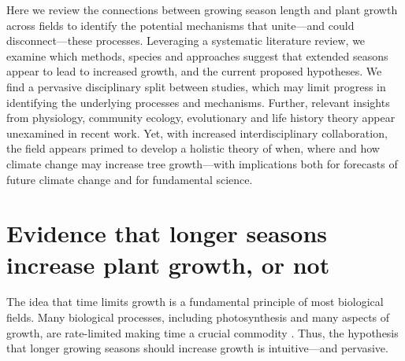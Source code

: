 \documentclass[11pt]{article}
\begin{document}
Here we review the connections between growing season length and plant growth across fields to identify the potential mechanisms that unite---and could disconnect---these processes. %
Leveraging a systematic literature review, we examine which methods, species and approaches suggest that extended seasons appear to lead to increased growth, and the current proposed hypotheses. We find a pervasive disciplinary split between studies, which may limit progress in identifying the underlying processes and mechanisms. Further, relevant insights from physiology, community ecology, evolutionary and life history theory appear unexamined in recent work. Yet, with increased interdisciplinary collaboration, the field appears primed to develop a holistic theory of when, where and how climate change may increase tree growth---with implications both for forecasts of future climate change and for fundamental science.

\section*{Evidence that longer seasons increase plant growth, or not}
The idea that time limits growth is a fundamental principle of most biological fields. Many biological processes, including photosynthesis and many aspects of growth, are rate-limited making time a crucial commodity \citep{nobel1983biophysical,cosgrove2005growth,hilty2021plant}. Thus, the hypothesis that longer growing seasons should increase growth is intuitive---and pervasive. 
\end{document}
